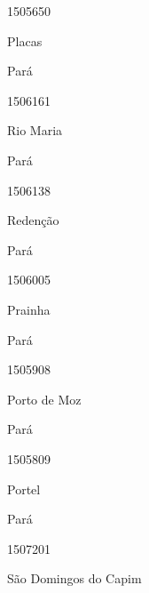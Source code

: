 \documentclass[
  letterpaper,
]{report}
\begin{document}
1505650

\n      

Placas

\n    

\n    

\n      

Pará

\n      

1506161

\n      

Rio Maria

\n    

\n    

\n      

Pará

\n      

1506138

\n      

Redenção

\n    

\n    

\n      

Pará

\n      

1506005

\n      

Prainha

\n    

\n    

\n      

Pará

\n      

1505908

\n      

Porto de Moz

\n    

\n    

\n      

Pará

\n      

1505809

\n      

Portel

\n    

\n    

\n      

Pará

\n      

1507201

\n      

São Domingos do Capim

\n    

\n    
\end{document}
